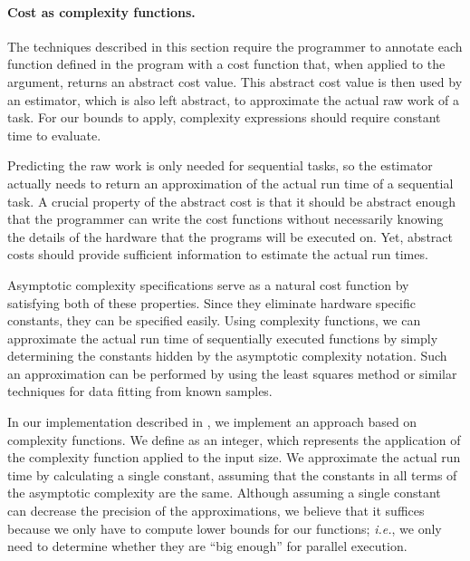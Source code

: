 \paragraph{Cost as complexity functions.} 

The techniques described in this section require the programmer to
annotate each function defined in the program with a cost function
that, when applied to the argument, returns an abstract cost value.
This abstract cost value is then used by an estimator, which is also
left abstract, to approximate the actual raw work of a task. 
For our bounds to apply, complexity expressions
should require constant time to evaluate.

Predicting the raw work is only needed for sequential tasks,
so the estimator actually needs to return an approximation of the actual run
time of a sequential task.  A crucial property of the abstract cost is
that it should be abstract enough that the programmer can write the
cost functions without necessarily knowing the details of the hardware
that the programs will be executed on.  Yet, abstract costs should
provide sufficient information to estimate the actual run times.   

Asymptotic complexity specifications serve as a natural cost function
by satisfying both of these properties.  Since they eliminate hardware
specific constants, they can be specified easily.  Using complexity
functions, we can approximate the actual run time of sequentially
executed functions by simply determining the constants hidden by the
asymptotic complexity notation.  Such an approximation can be
performed by using the least squares method or similar techniques for
data fitting from known samples.

In our implementation described in , we implement an
approach based on complexity functions.  We define \kwtypeofcost as an
integer, which represents the application of the complexity function
applied to the input size.  We approximate the actual run time by
calculating a single constant, assuming that the constants in all
terms of the asymptotic complexity are the same.  Although assuming a
single constant can decrease the precision of the approximations, we
believe that it suffices because we only have to compute lower bounds
for our functions; \textit{i.e.}, we only need to determine whether they are
``big enough'' for parallel execution.


